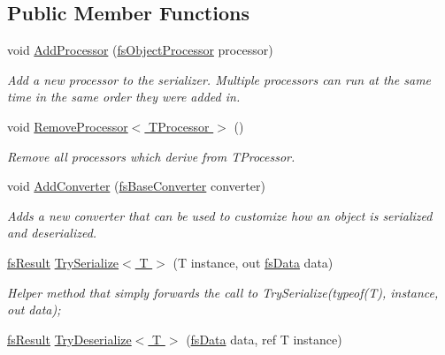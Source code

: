 \subsection*{Public Member Functions}
\begin{DoxyCompactItemize}
\item 
void \hyperlink{class_full_serializer_1_1fs_serializer_a30ed281d93548dcb4deea1815096f87b}{Add\+Processor} (\hyperlink{class_full_serializer_1_1fs_object_processor}{fs\+Object\+Processor} processor)
\begin{DoxyCompactList}\small\item\em Add a new processor to the serializer. Multiple processors can run at the same time in the same order they were added in. \end{DoxyCompactList}\item 
void \hyperlink{class_full_serializer_1_1fs_serializer_ae4ee8d86aefa7d639f2c63552ad2ec3a}{Remove\+Processor$<$ T\+Processor $>$} ()
\begin{DoxyCompactList}\small\item\em Remove all processors which derive from T\+Processor. \end{DoxyCompactList}\item 
void \hyperlink{class_full_serializer_1_1fs_serializer_aa9f27b67927f4e097ba578dd4d0145d2}{Add\+Converter} (\hyperlink{class_full_serializer_1_1fs_base_converter}{fs\+Base\+Converter} converter)
\begin{DoxyCompactList}\small\item\em Adds a new converter that can be used to customize how an object is serialized and deserialized. \end{DoxyCompactList}\item 
\hyperlink{struct_full_serializer_1_1fs_result}{fs\+Result} \hyperlink{class_full_serializer_1_1fs_serializer_a3b8863c9ebd9f7de51e0f77e6421f07c}{Try\+Serialize$<$ T $>$} (T instance, out \hyperlink{class_full_serializer_1_1fs_data}{fs\+Data} data)
\begin{DoxyCompactList}\small\item\em Helper method that simply forwards the call to Try\+Serialize(typeof(\+T), instance, out data); \end{DoxyCompactList}\item 
\hyperlink{struct_full_serializer_1_1fs_result}{fs\+Result} \hyperlink{class_full_serializer_1_1fs_serializer_aa9ce7d2b3fe6c0057504cba48b63e649}{Try\+Deserialize$<$ T $>$} (\hyperlink{class_full_serializer_1_1fs_data}{fs\+Data} data, ref T instance)

\end{DoxyCompactItemize}
